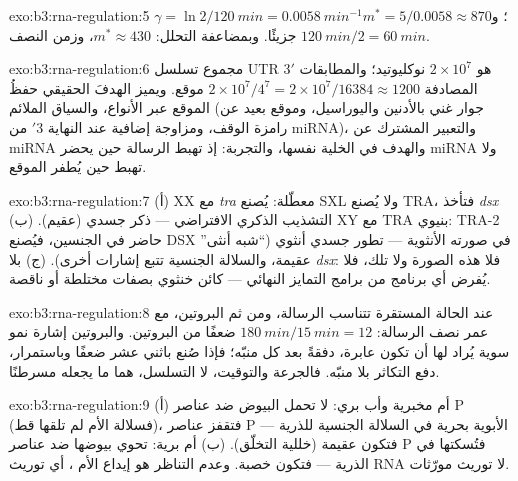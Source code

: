 \begin{solution}{exo:b3:rna-regulation:5}
$\gamma = \ln 2/\qty{120}{min} = \qty{0.0058}{min^{-1}}$؛ و$m^{*} =
5/0.0058 \approx 870$ جزيئًا. وبمضاعفة التحلل: $m^{*} \approx 430$،
وزمن النصف $\qty{120}{min}/2 = \qty{60}{min}$.
\end{solution}

\begin{solution}{exo:b3:rna-regulation:6}
مجموع تسلسل UTR 3$'$ هو $2\times 10^{7}$ نوكليوتيد؛ والمطابقات
المصادفة $2\times
10^{7}/4^{7} = 2\times 10^{7}/\num{16384} \approx \num{1200}$ موقع.
ويميز الهدفَ الحقيقي حفظُ الموقع عبر الأنواع، والسياق الملائم (جوار
غني بالأدنين واليوراسيل، وموقع بعيد عن رامزة الوقف، ومزاوجة إضافية عند النهاية
3$'$ من miRNA)، والتعبير المشترك عن miRNA والهدف في الخلية نفسها،
والتجربة: إذ تهبط الرسالة حين يحضر miRNA ولا تهبط حين يُطفر الموقع.
\end{solution}

\begin{solution}{exo:b3:rna-regulation:7}
(أ) XX مع \emph{tra} معطّلة: يُصنع SXL ولا يُصنع TRA، فتأخذ
\emph{dsx} التشذيب الذكري الافتراضي --- ذكر جسدي (عقيم). (ب) XY مع
TRA بنيوي: TRA-2 حاضر في الجنسين، فيُصنع DSX في صورته الأنثوية ---
تطور جسدي أنثوي (``شبه أنثى'' عقيمة، والسلالة الجنسية تتبع إشارات
أخرى). (ج) بلا \emph{dsx}: فلا هذه الصورة ولا تلك، فلا يُفرض أي
برنامج من برامج التمايز النهائي --- كائن خنثوي بصفات مختلطة أو
ناقصة.
\end{solution}

\begin{solution}{exo:b3:rna-regulation:8}
عند الحالة المستقرة تتناسب الرسالة، ومن ثم البروتين، مع عمر نصف
الرسالة: $\qty{180}{min}/\qty{15}{min} = 12$ ضعفًا من البروتين.
والبروتين إشارة نمو سوية يُراد لها أن تكون عابرة، دفقةً بعد كل
منبّه؛ فإذا صُنع باثني عشر ضعفًا وباستمرار، دفع التكاثر بلا منبّه.
فالجرعة والتوقيت، لا التسلسل، هما ما يجعله مسرطنًا.
\end{solution}

\begin{solution}{exo:b3:rna-regulation:9}
(أ) أم مخبرية وأب بري: لا تحمل البيوض  ضد عناصر P (فسلالة الأم
لم تلقها قط)، فتقفز عناصر P الأبوية بحرية في السلالة الجنسية للذرية
--- فتكون عقيمة (خللية التخلّق). (ب) أم برية: تحوي بيوضها  ضد
عناصر P فتُسكتها في الذرية --- فتكون خصبة. وعدم التناظر هو إيداع
الأم ، أي توريث RNA لا توريث مورّثات.
\end{solution}

